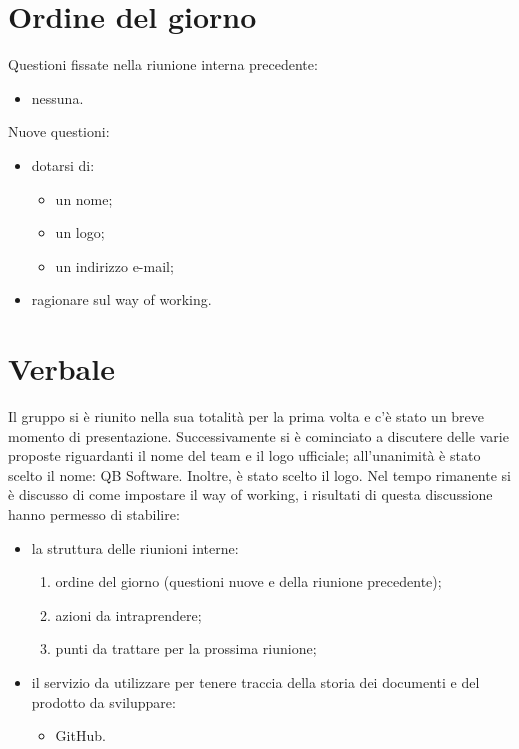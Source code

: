 \documentclass[12pt]{article}
\begin{document}
	\section{Ordine del giorno}
		Questioni fissate nella riunione interna precedente:
		\begin{itemize}
			\item nessuna.
		\end{itemize}
		Nuove questioni:
		\begin{itemize}
			\item dotarsi di:
			\begin{itemize}
				\item un nome;
				\item un logo;
				\item un indirizzo e-mail;
			\end{itemize}
			\item ragionare sul way of working.
		\end{itemize}
		
	\section{Verbale}
		Il gruppo si è riunito nella sua totalità per la prima volta e c'è stato un breve momento di presentazione. Successivamente si è cominciato a discutere delle varie proposte riguardanti il nome del team e il logo ufficiale; all'unanimità è stato scelto il nome: QB Software. Inoltre, è stato scelto il logo.
		Nel tempo rimanente si è discusso di come impostare il way of working, i risultati di questa discussione hanno permesso di stabilire:
		\begin{itemize}
			\item la struttura delle riunioni interne:
			\begin{enumerate}
				\item ordine del giorno (questioni nuove e della riunione precedente);
				\item azioni da intraprendere;
				\item punti da trattare per la prossima riunione;
			\end{enumerate} 
			
			\item il servizio da utilizzare per tenere traccia della storia dei documenti e del prodotto da sviluppare:
			\begin{itemize}
				\item GitHub.
			\end{itemize}
		\end{itemize}
		
\end{document}
